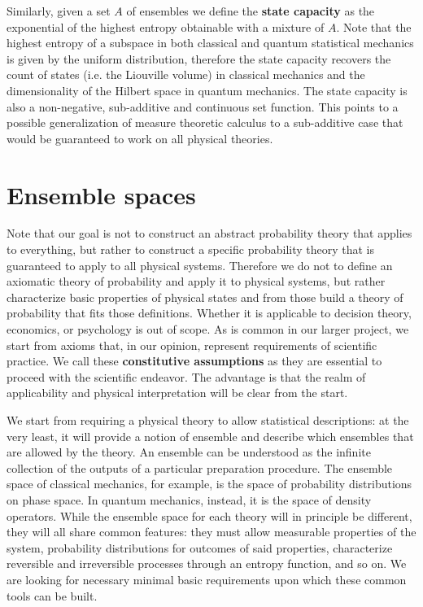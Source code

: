 \documentclass[10pt,twocolumn, nofootinbib]{revtex4-2}
\begin{document}
Similarly, given a set $A$ of ensembles we define the \textbf{state capacity} as the exponential of the highest entropy obtainable with a mixture of $A$. Note that the highest entropy of a subspace in both classical and quantum statistical mechanics is given by the uniform distribution, therefore the state capacity recovers the count of states (i.e. the Liouville volume) in classical mechanics and the dimensionality of the Hilbert space in quantum mechanics. The state capacity is also a non-negative, sub-additive and continuous set function. This points to a possible generalization of measure theoretic calculus to a sub-additive case that would be guaranteed to work on all physical theories.

\section{Ensemble spaces}

Note that our goal is not to construct an abstract probability theory that applies to everything, but rather to construct a specific probability theory that is guaranteed to apply to all physical systems. Therefore we do not to define an axiomatic theory of probability and apply it to physical systems, but rather characterize basic properties of physical states and from those build a theory of probability that fits those definitions. Whether it is applicable to decision theory, economics, or psychology is out of scope. As is common in our larger project, we start from axioms that, in our opinion, represent requirements of scientific practice. We call these \textbf{constitutive assumptions} as they are essential to proceed with the scientific endeavor. The advantage is that the realm of applicability and physical interpretation will be clear from the start. 

We start from requiring a physical theory to allow statistical descriptions: at the very least, it will provide a notion of ensemble and describe which ensembles that are allowed by the theory. An ensemble can be understood as the infinite collection of the outputs of a particular preparation procedure. The ensemble space of classical mechanics, for example, is the space of probability distributions on phase space. In quantum mechanics, instead, it is the space of density operators. While the ensemble space for each theory will in principle be different, they will all share common features: they must allow measurable properties of the system, probability distributions for outcomes of said properties, characterize reversible and irreversible processes through an entropy function, and so on. We are looking for necessary minimal basic requirements upon which these common tools can be built.
\end{document}
